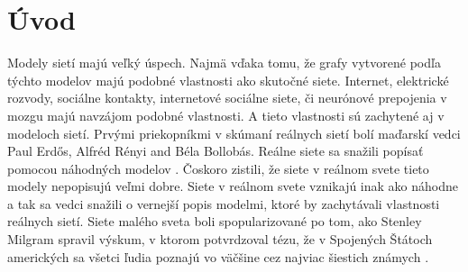 \cleardoublepage
{}
\chapter*{Úvod}\label{chap:intro}

Modely sietí majú veľký úspech. Najmä vďaka tomu, že grafy vytvorené podľa 
týchto modelov majú podobné vlastnosti ako skutočné siete. Internet, elektrické 
rozvody, sociálne kontakty, internetové sociálne siete, či neurónové prepojenia 
v mozgu majú navzájom podobné vlastnosti. A tieto vlastnosti sú zachytené aj v 
modeloch sietí. Prvými priekopníkmi v skúmaní reálnych sietí bolí maďarskí 
vedci Paul Erdős, Alfréd Rényi and Béla Bollobás. Reálne siete sa snažili 
popísať pomocou náhodných modelov \citep{erdos:rnd}. Čoskoro zistili, že 
siete v reálnom svete tieto modely nepopisujú veľmi dobre. Siete v reálnom 
svete vznikajú inak ako náhodne a tak sa vedci snažili o vernejší popis 
modelmi, ktoré by zachytávali vlastnosti reálnych sietí. Siete malého sveta 
boli spopularizované po tom, ako Stenley Milgram spravil výskum, v ktorom 
potvrdzoval tézu, že v Spojených Štátoch amerických sa všetci 
ľudia poznajú vo väčšine cez najviac šiestich známych \citep{kochen}.



